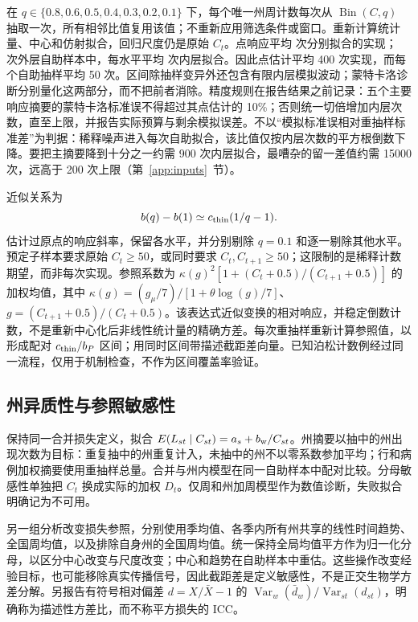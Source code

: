在 $q\in\{0.8,0.6,0.5,0.4,0.3,0.2,0.1\}$ 下，每个唯一州周计数每次从 $\operatorname{Bin}(C,q)$ 抽取一次，所有相邻比值复用该值；不重新应用筛选条件或窗口。重新计算统计量、中心和仿射拟合，回归尺度仍是原始 $C_t$。点响应平均 \ThinPointReps{} 次分别拟合的实现；\ThinBootstrap{} 次外层自助样本中，每水平平均 \ThinInnerReps{} 次内层拟合。因此点估计平均 400 次实现，而每个自助抽样平均 50 次。区间除抽样变异外还包含有限内层模拟波动；蒙特卡洛诊断分别量化这两部分，而不把前者消除。精度规则在报告结果之前记录：五个主要响应摘要的蒙特卡洛标准误不得超过其点估计的 10\%；否则统一切倍增加内层次数，直至上限，并报告实际预算与剩余模拟误差。不以“模拟标准误相对重抽样标准差”为判据：稀释噪声进入每次自助拟合，该比值仅按内层次数的平方根倒数下降。要把主摘要降到十分之一约需 900 次内层拟合，最嘈杂的留一差值约需 15000 次，远高于 200 次上限（第~\ref{app:inputs}~节）。

近似关系为
\begin{equation}
b(q)-b(1)\simeq c_{\rm thin}(1/q-1).
\label{eq:thinning}
\end{equation}
估计过原点的响应斜率，保留各水平，并分别剔除 $q=0.1$ 和逐一剔除其他水平。预定子样本要求原始 $C_t\ge50$，或同时要求 $C_t,C_{t+1}\ge50$；这限制的是稀释计数期望，而非每次实现。参照系数为 $\kappa(g)^2[1+(C_t+0.5)/(C_{t+1}+0.5)]$ 的加权均值，其中 $\kappa(g)=(g_\mu/7)/[1+\theta\log(g)/7]$、$g=(C_{t+1}+0.5)/(C_t+0.5)$。该表达式近似变换的相对响应，并稳定倒数计数，不是重新中心化后非线性统计量的精确方差。每次重抽样重新计算参照值，以形成配对 $c_{\rm thin}/b_P$ 区间；用同时区间带描述截距差向量。已知泊松计数例经过同一流程，仅用于机制检查，不作为区间覆盖率验证。

\subsection{州异质性与参照敏感性}
\label{sec:meth-fe}

保持同一合并损失定义，拟合 $E(L_{st}\mid C_{st})=a_s+b_{\rm w}/C_{st}$。州摘要以抽中的州出现次数为目标：重复抽中的州重复计入，未抽中的州不以零系数参加平均；行和病例加权摘要使用重抽样总量。合并与州内模型在同一自助样本中配对比较。分母敏感性单独把 $C_t$ 换成实际的加权 $D_t$。仅周和州加周模型作为数值诊断，失败拟合明确记为不可用。

另一组分析改变损失参照，分别使用季均值、各季内所有州共享的线性时间趋势、全国周均值，以及排除自身州的全国周均值。统一保持全局均值平方作为归一化分母，以区分中心改变与尺度改变；中心和趋势在自助样本中重估。这些操作改变经验目标，也可能移除真实传播信号，因此截距差是定义敏感性，不是正交生物学方差分解。另报告有符号相对偏差 $d=X/\bar X-1$ 的 $\operatorname{Var}_w(\bar d_w)/\operatorname{Var}_{st}(d_{st})$，明确称为描述性方差比，而不称平方损失的 ICC。

